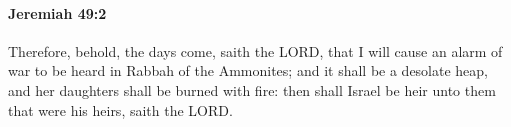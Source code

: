 
		\paragraph{Jeremiah 49:2} %
			\label{JEREMIAH-49-2}

			Therefore, behold, the days come, saith the LORD, that I will cause an alarm of war to be heard in Rabbah of the Ammonites; and it shall be a desolate heap, and her daughters shall be burned with fire: then shall Israel be heir unto them that were his heirs, saith the LORD.


